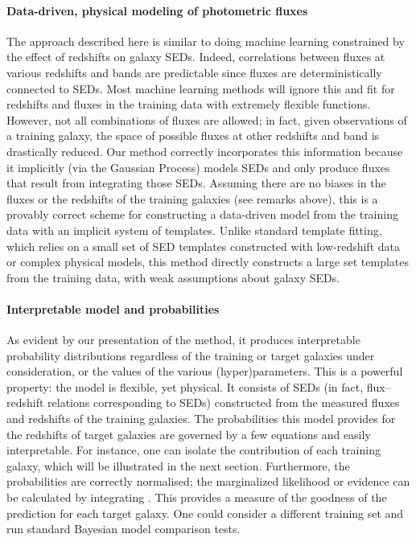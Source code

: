 \documentclass[aps,prd,showpacs,superscriptaddress,groupedaddress]{revtex4}  %
\begin{document}
\paragraph{Data-driven, physical modeling of photometric fluxes}
The approach described here is similar to doing machine learning constrained by the effect of redshifts on galaxy SEDs.
Indeed, correlations between fluxes at various redshifts and bands are predictable since fluxes are deterministically connected to SEDs.
Most machine learning methods will ignore this and fit for redshifts and fluxes in the training data with extremely flexible functions.
However, not all combinations of fluxes are allowed; in fact, given observations of a training galaxy, the space of possible fluxes at other redshifts and band is drastically reduced.
Our method correctly incorporates this information because it implicitly (via the Gaussian Process) models SEDs and only produce fluxes that result from integrating those SEDs.
Assuming there are no biases in the fluxes or the redshifts of the training galaxies (see remarks above), this is a provably correct scheme for constructing a data-driven model from the training data with an implicit system of templates.
Unlike standard template fitting, which relies on a small set of SED templates constructed with low-redshift data or complex physical models, this method directly constructs a large set templates from the training data, with weak assumptions about galaxy SEDs.

\paragraph{Interpretable model and probabilities} 
As evident by our presentation of the method, it produces interpretable probability distributions regardless of the training or target galaxies under consideration, or the values of the various (hyper)parameters.
This is a powerful property: the model is flexible, yet physical.
It consists of SEDs (in fact, flux--redshift relations corresponding to SEDs) constructed from the measured fluxes and redshifts of the training galaxies.
The probabilities this model provides for the redshifts of target galaxies are governed by a few equations and easily interpretable. 
For instance, one can isolate the contribution of each training galaxy, which will be illustrated in the next section.
Furthermore, the probabilities are correctly normalised; the marginalized likelihood or evidence can be calculated by integrating . 
This provides a measure of the goodness of the prediction for each target galaxy.
One could consider a different training set and run standard Bayesian model comparison tests. 
\end{document}
